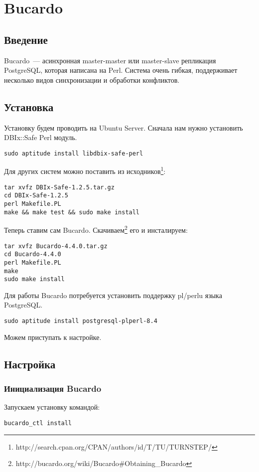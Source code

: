 \section{Bucardo}
\subsection{Введение}
Bucardo~--- асинхронная master-master или master-slave репликация PostgreSQL, которая написана на Perl. 
Система очень гибкая, поддерживает несколько видов синхронизации и обработки конфликтов.

\subsection{Установка}
Установку будем проводить на Ubuntu Server. Сначала нам нужно установить DBIx::Safe Perl модуль.
\begin{verbatim}
sudo aptitude install libdbix-safe-perl
\end{verbatim}

Для других систем можно поставить из исходников\footnote{http://search.cpan.org/CPAN/authors/id/T/TU/TURNSTEP/}:
\begin{verbatim}
tar xvfz DBIx-Safe-1.2.5.tar.gz
cd DBIx-Safe-1.2.5
perl Makefile.PL
make && make test && sudo make install
\end{verbatim}

Теперь ставим сам Bucardo. Скачиваем\footnote{http://bucardo.org/wiki/Bucardo\#Obtaining\_Bucardo} его и инсталируем:
\begin{verbatim}
tar xvfz Bucardo-4.4.0.tar.gz
cd Bucardo-4.4.0
perl Makefile.PL
make
sudo make install
\end{verbatim}

Для работы Bucardo потребуется установить поддержку pl/perlu языка PostgreSQL.
\begin{verbatim}
sudo aptitude install postgresql-plperl-8.4
\end{verbatim}

Можем приступать к настройке.

\subsection{Настройка}
\subsubsection{Инициализация Bucardo}
Запускаем установку командой:
\begin{verbatim}
bucardo_ctl install
\end{verbatim}

